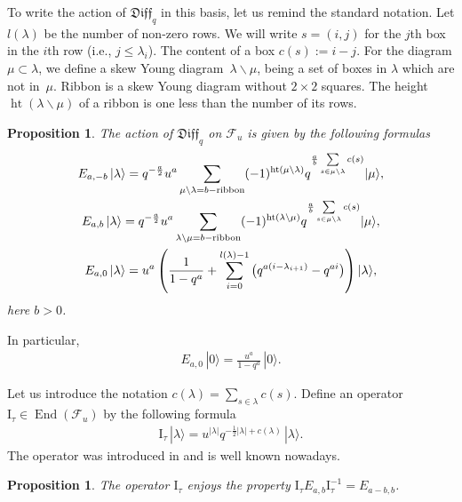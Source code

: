 \documentclass[pdftex]{sigma}
\numberwithin{equation}{section}
\newtheorem{Proposition}[Theorem]{Proposition}
\theoremstyle{definition}
\newcommand{\vac}{|0 \rangle}
\newcommand{\qD}{\mathfrak{Diff}_q}
\DeclareMathOperator{\End}{End}
\newcommand{\I}{\mathrm{I}}
\begin{document}
To write the action of $\qD$ in this basis, let us remind the standard notation. Let $l(\lambda)$ be the number of non-zero rows. We will write $s=(i,j)$ for the $j$th box in the $i$th row (i.e., $j \leqslant \lambda_i$). The content of a box
$c(s):=i-j$. For the diagram $\mu \subset \lambda$, we define a skew Young diagram~$\lambda \backslash \mu$, being a set of boxes in $\lambda$ which are not in~$\mu$. Ribbon is a skew Young diagram without $2\times2$ squares. The height $\operatorname{ht}(\lambda \backslash \mu)$ of a ribbon is one less than the number of its rows.
\begin{Proposition}
The action of $\qD$ on $\mathcal{F}_u$ is given by the following formulas
\begin{gather}
E_{a,-b} \, |\lambda\rangle= q^{-\frac{a}{2}}u^{a} \sum_{\mu \backslash \lambda =b-\text{\rm ribbon}} (-1)^{\operatorname{ht}(\mu \backslash \lambda)}q^{\frac{a}{b}\sum\limits_{s\in \mu \backslash \lambda}c(s)}|\mu\rangle, \label{eq: Fock basis action1} \\
E_{a,b} \, |\lambda\rangle= q^{-\frac{a}{2}} u^{a} \sum_{\lambda \backslash \mu =b-\text{\rm ribbon}} (-1)^{\operatorname{ht}(\lambda \backslash \mu)}q^{\frac{a}{b}\sum\limits_{s\in \mu \backslash \lambda}c(s)}|\mu\rangle,\\
E_{a,0} \, |\lambda\rangle= u^a \left( \frac{1}{1-q^a} + \sum_{i=0}^{l(\lambda)-1} \big(q^{a(i-\lambda_{i+1})} - q^{ai} \big) \right) |\lambda\rangle, \label{eq: Fock basis action3}
\end{gather}
here $b>0$.
\end{Proposition}
In particular,
\begin{gather}
E_{a,0} \, \vac =\frac{u^{a}}{1-q^{a}}\, \vac. \label{eq:eigen vac}
\end{gather}

Let us introduce the notation $c(\lambda) = \sum\limits_{s \in \lambda} c(s)$. Define an operator $\I_{\tau} \in \End( \mathcal{F}_u)$ by the following formula
\begin{gather} \label{eq: def I tau}
\I_{\tau}\, |\lambda \rangle = u^{|\lambda|} q^{-\frac12 |\lambda|+c(\lambda)}\, | \lambda \rangle.
\end{gather}
The operator was introduced in \cite{BGHT} and is well known nowadays.
\begin{Proposition} \label{prop: I sigma}
The operator $\I_{\tau}$ enjoys the property $\I_{\tau} E_{a,b} \I_{\tau}^{-1} = E_{a-b,b}$.
\end{Proposition}
\end{document}
